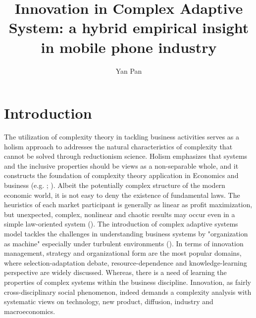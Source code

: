 \documentclass[utf8,english]{gradu3}
\begin{document}
\title{Innovation in Complex Adaptive System: a hybrid empirical insight in mobile phone industry}
\author{Yan Pan}

\maketitle

\mainmatter

\chapter{Introduction}

The utilization of complexity theory in tackling business activities serves as a holism approach to addresses the natural characteristics of complexity that cannot be solved through reductionism science. Holism emphasizes that systems and the inclusive properties should be views as a non-separable whole, and it constructs the foundation of complexity theory application in Economics and business (e.g. \cite{smuts1926holism}; \cite{auyang1999foundations}).  Albeit the potentially complex structure of the modern economic world, it is not easy to deny the existence of fundamental laws. The heuristics of each market participant is generally as linear as profit maximization, but unexpected, complex, nonlinear and chaotic results may occur even in a simple law-oriented system (\cite{nicolis1995introduction}). The introduction of complex adaptive systems model tackles the challenges in understanding business systems by "organization as machine" especially under turbulent environments (\cite{dooley1997complex}). In terms of innovation management, strategy and organizational form are the most popular domains, where selection-adaptation debate, resource-dependence and knowledge-learning perspective are widely discussed. Whereas, there is a need of learning the properties of complex systems within the business discipline. Innovation, as fairly cross-disciplinary social phenomenon, indeed demands a complexity analysis with systematic views on technology, new product, diffusion, industry and macroeconomics.
\end{document}
